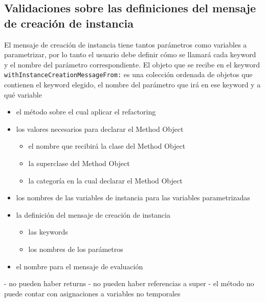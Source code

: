\subsection*{Validaciones sobre las definiciones del mensaje de creación de instancia}

El mensaje de creación de instancia tiene tantos parámetros como variables a parametrizar, por lo tanto
el usuario debe definir cómo se llamará cada keyword y el nombre del parámetro correspondiente. El objeto
que se recibe en el keyword \lstinline{withInstanceCreationMessageFrom:} es una colección ordenada
de objetos que contienen el keyword elegido, el nombre del parámetro que irá en ese keyword y a qué
variable









\begin{itemize}
    \item el método sobre el cual aplicar el refactoring
    \item los valores necesarios para declarar el Method Object
    \begin{itemize}
        \item el nombre que recibirá la clase del Method Object
        \item la superclase del Method Object
        \item la categoría en la cual declarar el Method Object
    \end{itemize}
    \item los nombres de las variables de instancia para las variables parametrizadas
    \item la definición del mensaje de creación de instancia
    \begin{itemize}
        \item las keywords
        \item los nombres de los parámetros
    \end{itemize}
    \item el nombre para el mensaje de evaluación
\end{itemize}




- no pueden haber returns
- no pueden haber referencias a super
- el método no puede contar con asignaciones a variables no temporales

